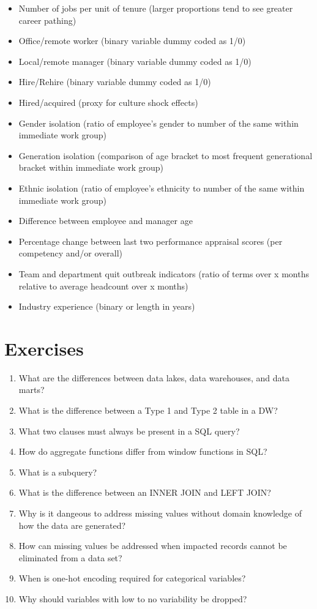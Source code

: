 \documentclass[]{book}
\providecommand{\tightlist}{%
  \setlength{\itemsep}{0pt}\setlength{\parskip}{0pt}}
\begin{document}
\begin{itemize}
\tightlist
\item
  Number of jobs per unit of tenure (larger proportions tend to see greater career pathing)
\item
  Office/remote worker (binary variable dummy coded as 1/0)
\item
  Local/remote manager (binary variable dummy coded as 1/0)
\item
  Hire/Rehire (binary variable dummy coded as 1/0)
\item
  Hired/acquired (proxy for culture shock effects)
\item
  Gender isolation (ratio of employee's gender to number of the same within immediate work
  group)
\item
  Generation isolation (comparison of age bracket to most frequent generational bracket within
  immediate work group)
\item
  Ethnic isolation (ratio of employee's ethnicity to number of the same within immediate work
  group)
\item
  Difference between employee and manager age
\item
  Percentage change between last two performance appraisal scores (per competency and/or
  overall)
\item
  Team and department quit outbreak indicators (ratio of terms over x months relative to average
  headcount over x months)
\item
  Industry experience (binary or length in years)
\end{itemize}

\hypertarget{exercises-5}{%
\section{Exercises}\label{exercises-5}}

\begin{enumerate}
\def\labelenumi{\arabic{enumi}.}
\item
  What are the differences between data lakes, data warehouses, and data marts?
\item
  What is the difference between a Type 1 and Type 2 table in a DW?
\item
  What two clauses must always be present in a SQL query?
\item
  How do aggregate functions differ from window functions in SQL?
\item
  What is a subquery?
\item
  What is the difference between an INNER JOIN and LEFT JOIN?
\item
  Why is it dangeous to address missing values without domain knowledge of how the data are generated?
\item
  How can missing values be addressed when impacted records cannot be eliminated from a data set?
\item
  When is one-hot encoding required for categorical variables?
\item
  Why should variables with low to no variability be dropped?
\end{enumerate}
\end{document}
